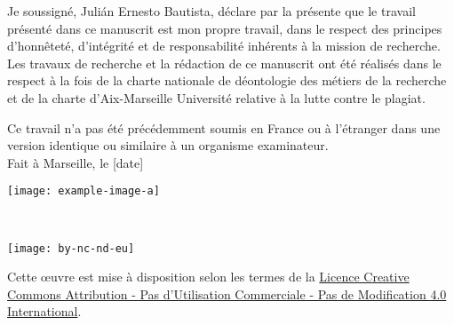 \iftrue %
    Je soussigné, Julián Ernesto Bautista, %
    déclare par la présente que le travail présenté dans ce manuscrit est mon propre travail, 
    dans le respect des principes d'honnêteté, d'intégrité et de responsabilité inhérents à la mission de recherche. Les travaux de recherche et la 
    rédaction de ce manuscrit ont été réalisés dans le respect à la fois de la charte nationale de déontologie des métiers de la recherche et de la 
    charte d'Aix-Marseille Université relative à la lutte contre le plagiat.
    
    Ce travail n'a pas été précédemment soumis en France ou à l'étranger dans une version identique ou similaire à un organisme examinateur.\\
    
    Fait à Marseille, le [date]
    
    \begin{flushright}\texttt{[image: example-image-a]}\end{flushright}%
\fi

\iffalse %
    I, undersigned, Julián Ernesto Bautista, %
    hereby declare that the work presented in this manuscript is my own work, %
    in accordance with the principles of honesty, integrity and responsibility inherent to the research mission. The research work and the writing of this manuscript have been carried out in compliance with both the french national charter for Research Integrity and the Aix-Marseille University charter on the fight against plagiarism.
    
    This work has not been submitted previously either in this country or in aother country in the same or in a similar version to any other examination body.\\
    
    Marseille, [date]
    
    \begin{flushright}\texttt{[image: example-image-b]}\texttt{[image: example-image-a]}\end{flushright} %
\fi

~\vfill
\begin{center}
	\begin{minipage}[c]{0.25\linewidth}
		\texttt{[image: by-nc-nd-eu]}
	\end{minipage}\hfill
\end{center}

Cette \oe{}uvre est mise à disposition selon les termes de la \href{https://creativecommons.org/licenses/by-nc-nd/4.0/deed.fr}{Licence Creative Commons Attribution - Pas d'Utilisation Commerciale - Pas de Modification 4.0 International}. %
